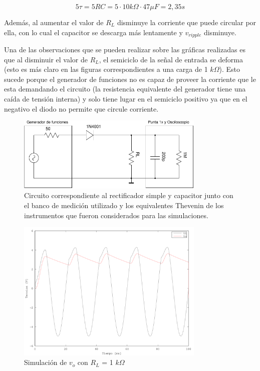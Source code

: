 \begin{equation}
5 \tau = 5 R C = 5 \cdot 10 k\Omega \cdot 47\mu F = 2,35 s
\end{equation}

Además, al aumentar el valor de $R_{L}$ disminuye la corriente que puede circular por ella, con lo cual el capacitor se descarga más lentamente y $v_{ripple}$ disminuye.

Una de las observaciones que se pueden realizar sobre las gráficas realizadas es que al disminuir el valor de $R_{L}$, el semiciclo de la señal de entrada se deforma (esto es más claro en las figuras correspondientes a una carga de 1 $k\Omega$). Esto sucede porque el generador de funciones no es capaz de proveer la corriente que le esta demandando el circuito (la resistencia equivalente del generador tiene una caída de tensión interna) y solo tiene lugar en el semiciclo positivo ya que en el negativo el diodo no permite que circule corriente.

\begin{figure}[H]
  \centering
      \includegraphics[width=0.8\textwidth]{gfxsantiago/FIG_CIRC_Rectificador_Simple_B.pdf}
  \caption{Circuito correspondiente al rectificador simple y capacitor junto con el banco de medición utilizado y los equivalentes Thevenin de los instrumentos que fueron considerados para las simulaciones.}
  \label{fig:circ_3B}
\end{figure}

\begin{figure}[H]
  \centering
      \includegraphics[width=0.8\textwidth]{gfxsantiago/FIG_SIM_Rectificador_Simple_3B1.png}
  \caption{Simulación de $v_{o}$ con $R_{L}$ = 1 $k\Omega$}
  \label{fig:sim_3B1}
\end{figure}


